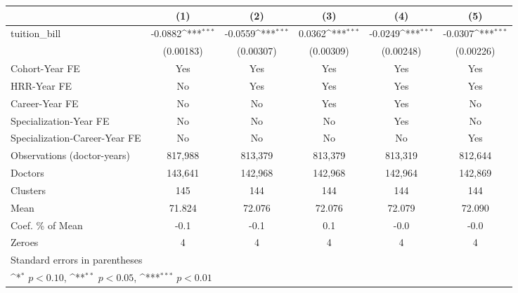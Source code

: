 {
\def\sym#1{\ifmmode^{#1}\else\(^{#1}\)\fi}
\begin{tabular}{l*{5}{c}}
\hline\hline
                    &\multicolumn{1}{c}{(1)}         &\multicolumn{1}{c}{(2)}         &\multicolumn{1}{c}{(3)}         &\multicolumn{1}{c}{(4)}         &\multicolumn{1}{c}{(5)}         \\
\hline
tuition\_bill        &     -0.0882\sym{***}&     -0.0559\sym{***}&      0.0362\sym{***}&     -0.0249\sym{***}&     -0.0307\sym{***}\\
                    &   (0.00183)         &   (0.00307)         &   (0.00309)         &   (0.00248)         &   (0.00226)         \\
[1em]
Cohort-Year FE      &         Yes         &         Yes         &         Yes         &         Yes         &         Yes         \\
[1em]
HRR-Year FE         &          No         &         Yes         &         Yes         &         Yes         &         Yes         \\
[1em]
Career-Year FE      &          No         &          No         &         Yes         &         Yes         &          No         \\
[1em]
Specialization-Year FE&          No         &          No         &          No         &         Yes         &          No         \\
[1em]
Specialization-Career-Year FE&          No         &          No         &          No         &          No         &         Yes         \\
\hline
Observations (doctor-years)&     817,988         &     813,379         &     813,379         &     813,319         &     812,644         \\
Doctors             &     143,641         &     142,968         &     142,968         &     142,964         &     142,869         \\
Clusters            &         145         &         144         &         144         &         144         &         144         \\
Mean                &      71.824         &      72.076         &      72.076         &      72.079         &      72.090         \\
Coef. \% of Mean    &        -0.1         &        -0.1         &         0.1         &        -0.0         &        -0.0         \\
Zeroes              &           4         &           4         &           4         &           4         &           4         \\
\hline\hline
\multicolumn{6}{l}{\footnotesize Standard errors in parentheses}\\
\multicolumn{6}{l}{\footnotesize \sym{*} \(p<0.10\), \sym{**} \(p<0.05\), \sym{***} \(p<0.01\)}\\
\end{tabular}
}
